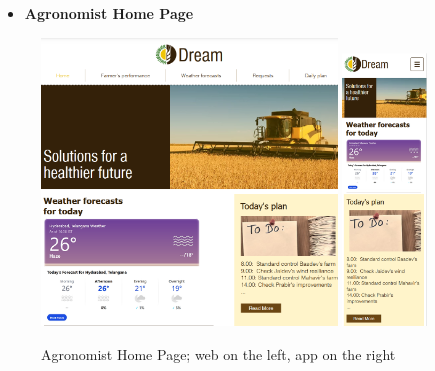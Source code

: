 \documentclass{article}
\begin{document}
    \begin{itemize}
        \item \textbf{Agronomist Home Page}
    \end{itemize}
        \begin{figure} [h]
            \centering
            \includegraphics[width=0.7\textwidth]{images/UserInterfaces/Agronomist/AgronomistHomePageWeb.png}
            \quad
            \includegraphics[width=0.2\textwidth]{images/UserInterfaces/Agronomist/AgronomistHomePageApp.png}
            \quad
            \caption{\label{fig:agronomistHomePage}Agronomist Home Page; web on the left, app on the right}
        \end{figure}
    
    
    \newpage
    
\end{document}
